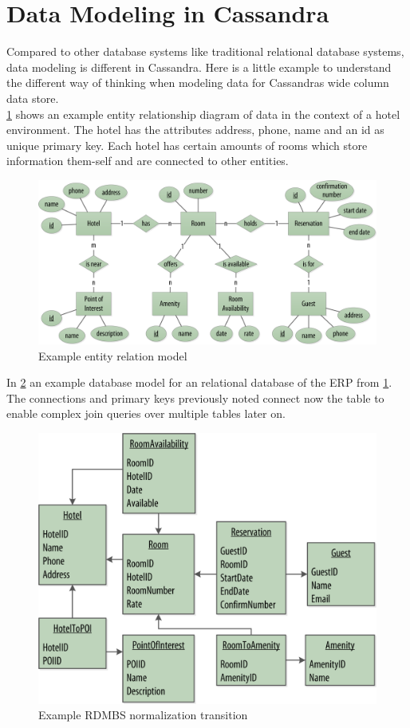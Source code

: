\section{Data Modeling in Cassandra}  %

Compared to other database systems like traditional relational database systems, data modeling is different in Cassandra. Here is a little example to understand the different way of thinking when modeling data for Cassandras wide column data store. \\

\ref{fig:cassandra:model_data0} shows an example entity relationship diagram of data in the context of a hotel environment. The hotel has the attributes address, phone, name and an id as unique primary key. Each hotel has certain amounts of rooms which store information them-self and are connected to other entities.

\begin{figure}[H]
    \centering
    \includegraphics[width=0.75\columnwidth]{img/model_example_entity_relation_step0.png}
    \caption{Example entity relation model \autocite{cassandra_oreilly}}
    \label{fig:cassandra:model_data0}
\end{figure}

In \ref{fig:cassandra:model_data1} an example database model for an relational database of the ERP from \ref{fig:cassandra:model_data0}.
The connections and primary keys previously noted connect now the table to enable complex join queries over multiple tables later on.

\begin{figure}[H]
    \centering
    \includegraphics[width=0.75\columnwidth]{img/model_example_rdbms_step1.png}
    \caption{Example RDMBS normalization transition \autocite{cassandra_oreilly}}
    \label{fig:cassandra:model_data1}
\end{figure}


